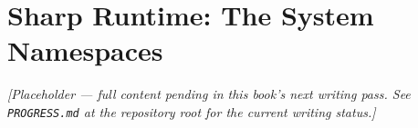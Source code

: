 \chapter{Sharp Runtime: The System Namespaces}
\label{ch:sharp-runtime-namespaces}

\emph{[Placeholder --- full content pending in this book's next writing pass. See \texttt{PROGRESS.md} at the repository root for the current writing status.]}

